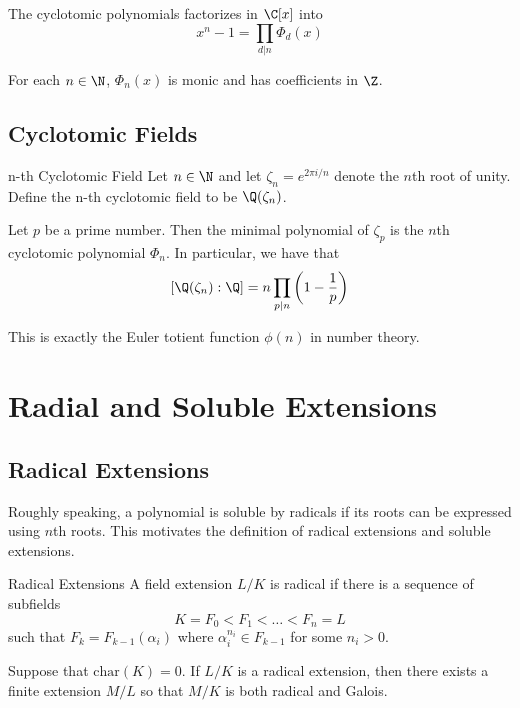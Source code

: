 \documentclass[a4paper]{article}
\begin{document}
\begin{prp}{}{} The cyclotomic polynomials factorizes in $\C[x]$ into $$x^n-1=\prod_{d|n}\Phi_d(x)$$
\end{prp}

\begin{prp}{}{} For each $n\in\N$, $\Phi_n(x)$ is monic and has coefficients in $\Z$. 
\end{prp}

\subsection{Cyclotomic Fields}
\begin{defn}{n-th Cyclotomic Field}{} Let $n\in\N$ and let $\zeta_n=e^{2\pi i/n}$ denote the $n$th root of unity. Define the n-th cyclotomic field to be $\Q(\zeta_n)$. 
\end{defn}

\begin{prp}{}{} Let $p$ be a prime number. Then the minimal polynomial of $\zeta_p$ is the $n$th cyclotomic polynomial $\Phi_n$. In particular, we have that $$[\Q(\zeta_n):\Q]=n\prod_{p|n}\left(1-\frac{1}{p}\right)$$
\end{prp}

This is exactly the Euler totient function $\phi(n)$ in number theory. 

\pagebreak
\section{Radial and Soluble Extensions}
\subsection{Radical Extensions}
Roughly speaking, a polynomial is soluble by radicals if its roots can be expressed using $n$th roots. This motivates the definition of radical extensions and soluble extensions. 

\begin{defn}{Radical Extensions}{} A field extension $L/K$ is radical if there is a sequence of subfields $$K=F_0<F_1<\dots<F_n=L$$ such that $F_k=F_{k-1}(\alpha_i)$ where $\alpha_i^{n_i}\in F_{k-1}$ for some $n_i>0$. 
\end{defn}

\begin{prp}{}{} Suppose that $\text{char}(K)=0$. If $L/K$ is a radical extension, then there exists a finite extension $M/L$ so that $M/K$ is both radical and Galois. 
\end{prp}
\end{document}
